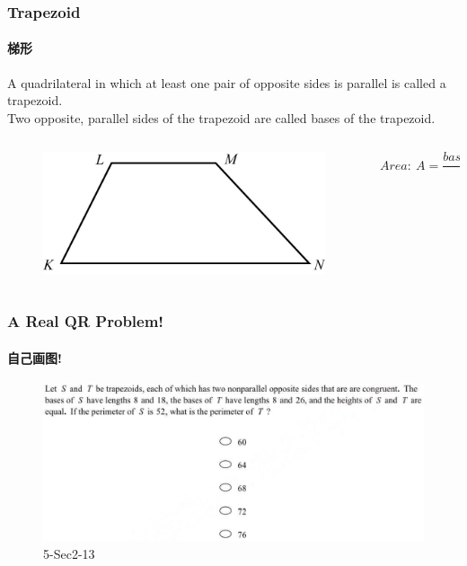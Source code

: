 \documentclass[
	11pt, %
]{beamer}
\begin{document}
	\begin{frame}
	\frametitle{Trapezoid} %
	\framesubtitle{梯形}
	\begin{definition}
A quadrilateral in which at least one pair of opposite sides is
parallel is called a trapezoid. \\
Two opposite, parallel sides of the
trapezoid are called bases of the trapezoid.
	\end{definition}

	\begin{columns}[t] 
		\begin{column}{0.5\textwidth} %
			\begin{figure}
				\includegraphics[width=\linewidth]{trapezoid.jpg}
			\end{figure}
		\end{column}

		\begin{column}{0.5\textwidth} %
			\begin{equation*}
				Area:\ A = \frac{base_1 + base_2}{2}\cdot height
			\end{equation*}
		\end{column}
	\end{columns}
\end{frame}



\begin{frame}
	\frametitle{A Real QR Problem!}
	\framesubtitle{自己画图!}
	\begin{figure}
		\includegraphics[width=\linewidth]{Trapezoid_Question1.png}
		\caption{5-Sec2-13}
	\end{figure}
\end{frame}
\end{document}
